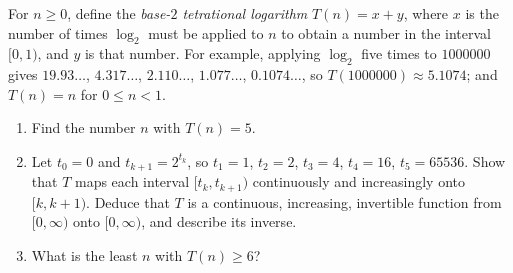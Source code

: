 For $n\ge0$, define the \emph{base-$2$ tetrational logarithm} $T(n)=x+y$, where $x$ is the number of times $\log_2$ must be applied to $n$ to obtain a number in the interval $[0,1)$, and $y$ is that number. For example, applying $\log_2$ five times to $1000000$ gives $19.93\ldots$, $4.317\ldots$, $2.110\ldots$, $1.077\ldots$, $0.1074\ldots$, so $T(1000000)\approx5.1074$; and $T(n)=n$ for $0\le n<1$.
\begin{enumerate}
\item[(a)] Find the number $n$ with $T(n)=5$.
\item[(b)] Let $t_0=0$ and $t_{k+1}=2^{t_k}$, so $t_1=1$, $t_2=2$, $t_3=4$, $t_4=16$, $t_5=65536$. Show that $T$ maps each interval $[t_k,t_{k+1})$ continuously and increasingly onto $[k,k+1)$. Deduce that $T$ is a continuous, increasing, invertible function from $[0,\infty)$ onto $[0,\infty)$, and describe its inverse.
\item[(c)] What is the least $n$ with $T(n)\ge6$?
\end{enumerate}
